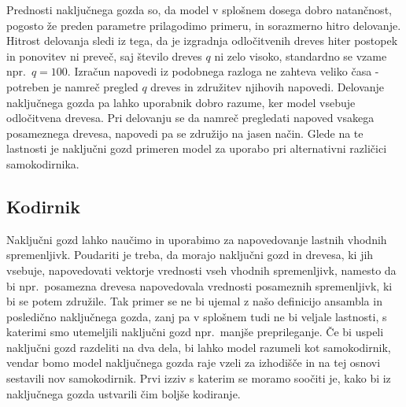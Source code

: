\documentclass[12pt,a4paper]{article}
\begin{document}


Prednosti naključnega gozda so, da model v splošnem dosega dobro natančnost, pogosto že preden parametre prilagodimo primeru, in sorazmerno hitro delovanje. 
Hitrost delovanja sledi iz tega, da je izgradnja odločitvenih dreves hiter postopek in ponovitev ni preveč, saj število dreves $q$ ni zelo visoko, standardno se vzame npr.\ $q = 100$. 
Izračun napovedi iz podobnega razloga ne zahteva veliko časa - potreben je namreč pregled $q$ dreves in združitev njihovih napovedi. 
Delovanje naključnega gozda pa lahko uporabnik dobro razume, ker model vsebuje odločitvena drevesa. 
Pri delovanju se da namreč pregledati napoved vsakega posameznega drevesa, napovedi pa se združijo na jasen način. 
Glede na te lastnosti je naključni gozd primeren model za uporabo pri alternativni različici samokodirnika.



\subsection{Kodirnik}

Naključni gozd lahko naučimo in uporabimo za napovedovanje lastnih vhodnih spremenljivk. 
Poudariti je treba, da morajo naključni gozd in drevesa, ki jih vsebuje, napovedovati vektorje vrednosti vseh vhodnih spremenljivk, namesto da bi npr.\ 
posamezna drevesa napovedovala vrednosti posameznih spremenljivk, ki bi se potem združile. 
Tak primer se ne bi ujemal z našo definicijo ansambla in posledično naključnega gozda, zanj pa v splošnem tudi ne bi veljale lastnosti, s katerimi smo utemeljili naključni gozd npr.\ manjše preprileganje. 
Če bi uspeli naključni gozd razdeliti na dva dela, bi lahko model razumeli kot samokodirnik, vendar bomo model naključnega gozda raje vzeli za izhodišče in na tej osnovi sestavili nov samokodirnik. 
Prvi izziv s katerim se moramo soočiti je, kako bi iz naključnega gozda ustvarili čim boljše kodiranje.
\end{document}
